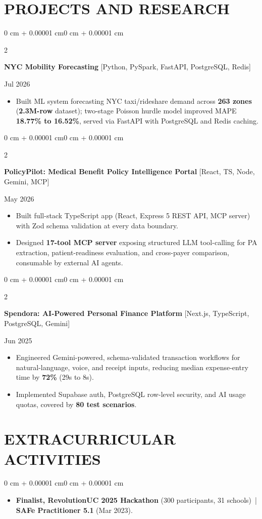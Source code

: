 \documentclass[10pt, letterpaper]{article}
\newenvironment{highlights}{
    \begin{itemize}[
        topsep=0.10 cm,
        parsep=0.06 cm,
        partopsep=0pt,
        itemsep=0.06 cm,
        leftmargin=12pt
    ]
}{
    \end{itemize}
}
\newenvironment{onecolentry}{
    \begin{adjustwidth}{0 cm + 0.00001 cm}{0 cm + 0.00001 cm}
}{
    \end{adjustwidth}
}
\newenvironment{twocolentry}[2][]{
    \onecolentry
    \def\secondColumn{#2}
    \setcolumnwidth{\fill, 4.5 cm}
    \begin{paracol}{2}
}{
    \switchcolumn \raggedleft \secondColumn
    \end{paracol}
    \endonecolentry
}
\begin{document}
\section{PROJECTS AND RESEARCH}
\begin{twocolentry}{Jul 2026}
\textbf{NYC Mobility Forecasting} [Python, PySpark, FastAPI, PostgreSQL, Redis]
\end{twocolentry}
\begin{highlights}
  \item Built ML system forecasting NYC taxi/rideshare demand across \textbf{263 zones} (\textbf{2.3M-row} dataset); two-stage Poisson hurdle model improved MAPE \textbf{18.77\% to 16.52\%}, served via FastAPI with PostgreSQL and Redis caching.
\end{highlights}
\vspace{0.15 cm}

\begin{twocolentry}{May 2026}
\textbf{PolicyPilot: Medical Benefit Policy Intelligence Portal} [React, TS, Node, Gemini, MCP]
\end{twocolentry}
\begin{highlights}
  \item Built full-stack TypeScript app (React, Express 5 REST API, MCP server) with Zod schema validation at every data boundary.
  \item Designed \textbf{17-tool MCP server} exposing structured LLM tool-calling for PA extraction, patient-readiness evaluation, and cross-payer comparison, consumable by external AI agents.
\end{highlights}
\vspace{0.15 cm}

\begin{twocolentry}{Jun 2025}
\textbf{Spendora: AI-Powered Personal Finance Platform} [Next.js, TypeScript, PostgreSQL, Gemini]
\end{twocolentry}
\begin{highlights}
  \item Engineered Gemini-powered, schema-validated transaction workflows for natural-language, voice, and receipt inputs, reducing median expense-entry time by \textbf{72\%} (29s to 8s).
  \item Implemented Supabase auth, PostgreSQL row-level security, and AI usage quotas, covered by \textbf{80 test scenarios}.
\end{highlights}
\vspace{0.07 cm}

\section{EXTRACURRICULAR ACTIVITIES}
\begin{onecolentry}
\begin{highlights}
  \item \textbf{Finalist, RevolutionUC 2025 Hackathon} (300 participants, 31 schools) \,|\, \textbf{SAFe Practitioner 5.1} (Mar 2023).
\end{highlights}
\end{onecolentry}
\end{document}
